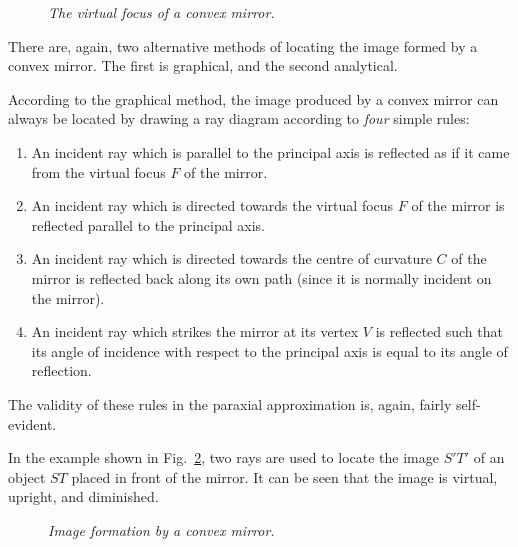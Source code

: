 \begin{figure}
\epsfysize=3.5in
\centerline{}
\caption{\em  The virtual focus of a convex mirror.}\label{f13.7}
\end{figure}

There are, again, two alternative methods of locating the image
formed by a convex mirror. The first is graphical, and the second
analytical.

According to the graphical method, 
the image produced by a convex mirror can always be located 
by drawing a ray diagram according to {\em four}\/ simple rules:
\begin{enumerate}
\item An incident ray which is parallel to the principal axis
is reflected as if it came from the virtual focus $F$ of the
mirror.
\item An incident ray which is directed towards the virtual
focus $F$ of the mirror is reflected parallel to the
principal axis.
\item An incident ray which is directed towards the centre of
curvature $C$ of the mirror is reflected back along its own
path (since it is normally incident on the mirror).
\item An incident ray which strikes the mirror at its vertex $V$
is reflected such that its angle of incidence with respect to the
principal axis is equal to its angle of reflection.
\end{enumerate}
The validity of these rules in the paraxial approximation is,
again, fairly self-evident.

In the example shown in Fig.~\ref{f13.8}, two rays are used to locate the image
$S'T'$ of an object $ST$ placed in front of the mirror. 
It can be seen that the image is virtual, upright, and diminished.

\begin{figure}
\epsfysize=3in
\centerline{}
\caption{\em Image formation by a convex mirror.}\label{f13.8}
\end{figure}

